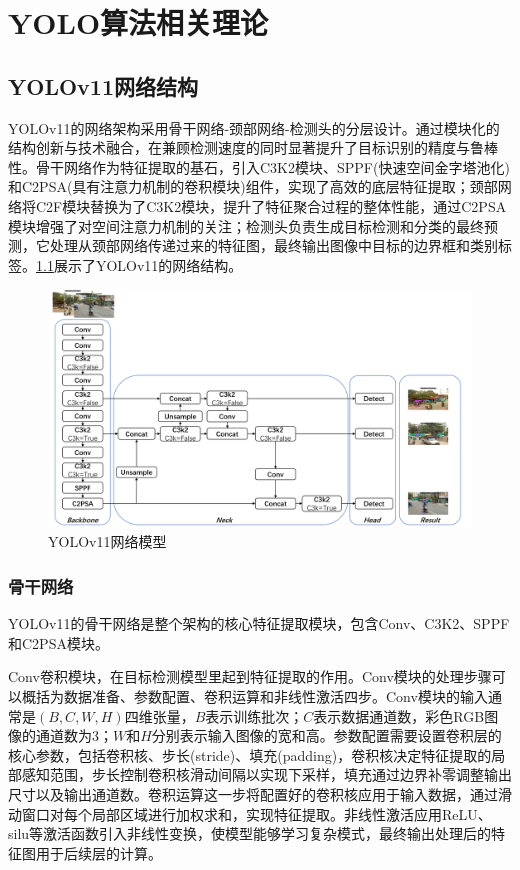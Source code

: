 
\chapter{YOLO算法相关理论}

\section{YOLOv11网络结构}
YOLOv11的网络架构采用骨干网络-颈部网络-检测头的分层设计。通过模块化的结构创新与技术融合，在兼顾检测速度的同时显著提升了目标识别的精度与鲁棒性。骨干网络作为特征提取的基石，引入C3K2模块、SPPF(快速空间金字塔池化)和C2PSA(具有注意力机制的卷积模块)组件，实现了高效的底层特征提取；颈部网络将C2F模块替换为了C3K2模块，提升了特征聚合过程的整体性能，通过C2PSA模块增强了对空间注意力机制的关注；检测头负责生成目标检测和分类的最终预测，它处理从颈部网络传递过来的特征图，最终输出图像中目标的边界框和类别标签。\ref{fig:s}展示了YOLOv11的网络结构。
\begin{figure}[!htb]
  \centering
  \includegraphics[width=1\textwidth]{figs/chap02/yolov11.png}
  \caption{YOLOv11网络模型}
  \label{fig:s}
\end{figure}

\subsection{骨干网络}
YOLOv11的骨干网络是整个架构的核心特征提取模块，包含Conv、C3K2、SPPF和C2PSA模块。

Conv卷积模块，在目标检测模型里起到特征提取的作用。Conv模块的处理步骤可以概括为数据准备、参数配置、卷积运算和非线性激活四步。Conv模块的输入通常是$(B, C, W, H)$四维张量，$B$表示训练批次；$C$表示数据通道数，彩色RGB图像的通道数为3；$W$和$H$分别表示输入图像的宽和高。参数配置需要设置卷积层的核心参数，包括卷积核、步长(stride)、填充(padding)，卷积核决定特征提取的局部感知范围，步长控制卷积核滑动间隔以实现下采样，填充通过边界补零调整输出尺寸以及输出通道数。卷积运算这一步将配置好的卷积核应用于输入数据，通过滑动窗口对每个局部区域进行加权求和，实现特征提取。非线性激活应用ReLU、silu等激活函数引入非线性变换，使模型能够学习复杂模式，最终输出处理后的特征图用于后续层的计算。

